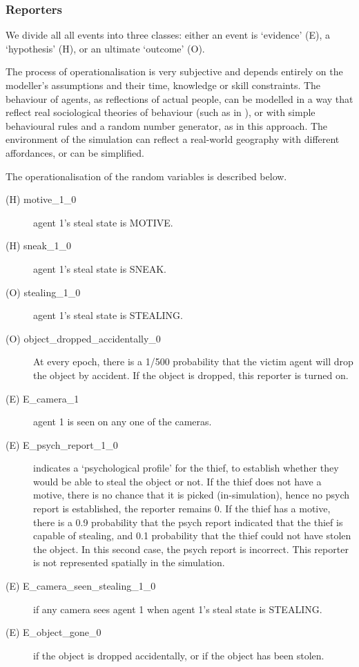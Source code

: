 \documentclass[12pt]{article}
\begin{document}
\subsubsection{Reporters}
We divide all all events into three classes: either an event is `evidence' (E), a `hypothesis' (H), or an ultimate `outcome' (O). 

The process of operationalisation is very subjective and depends entirely on the modeller's assumptions and their time, knowledge or skill constraints. The behaviour of agents, as reflections of actual people, can be modelled in a way that reflect real sociological theories of behaviour (such as in \citet{Gerritsen2015}), or with simple behavioural rules and a random number generator, as in this approach. The environment of the simulation can reflect a real-world geography with different affordances, or can be simplified. 

The operationalisation of the random variables is described below. 
\begin{description}
\item[(H) motive\_1\_0 ] agent 1's steal state is MOTIVE.
\item[(H) sneak\_1\_0 ] agent 1's steal state is SNEAK.
\item[(O) stealing\_1\_0 ] agent 1's steal state is STEALING.
\item[(O) object\_dropped\_accidentally\_0 ] At every epoch, there is a 1/500 probability that the victim agent will drop the object by accident. If the object is dropped, this reporter is turned on.
\item[(E) E\_camera\_1 ] agent 1 is seen on any one of the cameras.
\item[(E) E\_psych\_report\_1\_0 ] indicates a `psychological profile' for the thief, to establish whether they would be able to steal the object or not. If the thief does not have a motive, there is no chance that it is picked (in-simulation), hence no psych report is established, the reporter remains 0. If the thief has a motive, there is a 0.9 probability that the psych report indicated that the thief is capable of stealing, and 0.1 probability that the thief could not have stolen the object. In this second case, the psych report is incorrect. This reporter is not represented spatially in the simulation.
\item[(E) E\_camera\_seen\_stealing\_1\_0 ]  if any camera sees agent 1 when agent 1's steal state is STEALING.
\item[(E) E\_object\_gone\_0 ] if the object is dropped accidentally, or if the object has been stolen.
\end{description}
\end{document}
